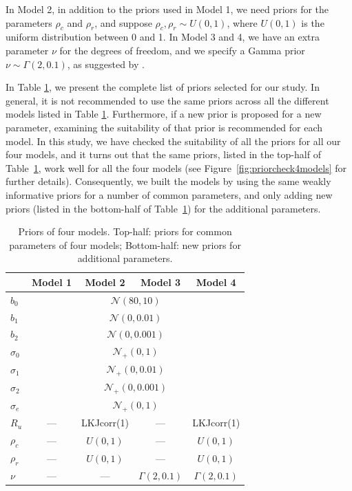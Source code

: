 \documentclass[a4paper]{article}   	%
\newcommand{\N}{\mathcal{N}}
\begin{document}
	
	
	In Model 2, in addition to the priors used in Model 1, we need priors for the parameters $\rho_c$ and $\rho_r$, and suppose $\rho_c,\rho_r\sim U(0,1)$, where $U(0,1)$ is the uniform distribution between 0 and 1. In Model 3 and 4, we have an extra parameter $\nu$ for the degrees of freedom, and we specify a Gamma prior $\nu\sim \Gamma(2,0.1)$, as suggested by \textcite{Juarez2010ModelBased}. 
	
	In Table \ref{tb:priors}, we present the complete list of priors selected for our study. In general, it is not recommended to use the same priors across all the different models listed in Table \ref{tb:priors}. Furthermore, if a new prior is proposed for a new parameter, examining the suitability of that prior is recommended for each model. In this study, we have checked the suitability of all the priors for all our four models, and it turns out that the same priors, listed in the top-half of Table~\ref{tb:priors}, work well for all the four models (see Figure~\ref{fig:priorcheck4models} for further details). Consequently, we built the models by using the same weakly informative priors for a number of common parameters, and only adding new priors (listed in the bottom-half of Table~\ref{tb:priors}) for the additional parameters.
	
	
	
	
	\begin{table}[!htp]
		\centering
		\begin{tabular}{l *{4}{c}} \toprule
			& Model 1 & Model 2& Model 3& Model 4  \\ \midrule
			$b_0$ & \multicolumn{4}{c}{$\N(80, 10)$} \\ 
			$b_1$ & \multicolumn{4}{c}{$\N(0, 0.01)$} \\ 
			$b_2$ & \multicolumn{4}{c}{$\N(0, 0.001)$} \\ 
			$\sigma_0$ & \multicolumn{4}{c}{$\N_+(0, 1)$} \\ 
			$\sigma_1$ & \multicolumn{4}{c}{$\N_+(0, 0.01)$} \\
			$\sigma_2$ & \multicolumn{4}{c}{$\N_+(0, 0.001)$} \\ 
			$\sigma_e$ & \multicolumn{4}{c}{$\N_+(0, 1)$} \\ \midrule
			$R_u$ & --- & LKJcorr(1) & --- & LKJcorr(1) \\ 
			$\rho_c$ & --- & $U(0,1)$ & --- & $U(0,1)$ \\ 
			$\rho_r$ & --- & $U(0,1)$ & --- &  $U(0,1)$ \\ 		
			$\nu$ & --- &  --- & $\Gamma(2,0.1)$ & $\Gamma(2,0.1)$ \\ 
			\bottomrule
		\end{tabular}\caption{Priors of four models. Top-half: priors for common parameters of four models; Bottom-half: new priors for additional parameters.}\label{tb:priors}
	\end{table}
	
\end{document}
